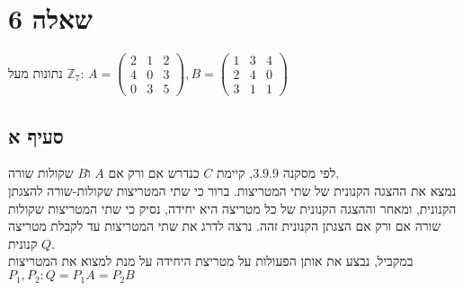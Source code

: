 \documentclass{article}
\begin{document}
\pagebreak

\section*{שאלה 6}

נתונות מעל $\mathbb{Z}_7$:
$
    A = \begin{pmatrix}
        2 & 1 & 2 \\
        4 & 0 & 3 \\
        0 & 3 & 5
    \end{pmatrix},
    B = \begin{pmatrix}
        1 & 3 & 4 \\
        2 & 4 & 0 \\
        3 & 1 & 1
    \end{pmatrix}
$

\subsection*{סעיף א}

לפי מסקנה $3.9.9$,
קיימת $C$
כנדרש אם ורק אם $A$ ו$B$ שקולות שורה.\\
נמצא את ההצגה הקנונית של שתי המטריצות. ברור כי שתי המטריצות שקולות-שורה להצגתן הקנונית,
ומאחר וההצגה הקנונית של כל מטריצה היא יחידה, נסיק כי שתי המטריצות שקולות שורה אם ורק אם הצגתן הקנונית זהה.
נרצה לדרג את שתי המטריצות עד לקבלת מטריצה קנונית $Q$. \\
במקביל, נבצע את אותן הפעולות על מטריצת היחידה על מנת למצוא את המטריצות $P_1, P_2: Q=P_1A= P_2B$
\end{document}
